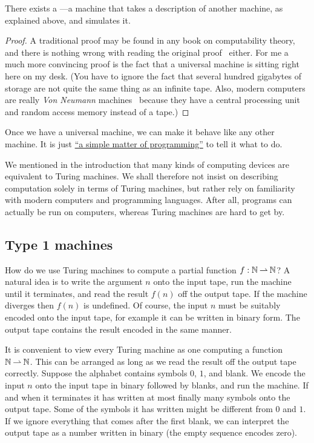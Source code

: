\begin{theorem}[Turing]
  \label{thm:universal-machine}
  There exists a ---a machine that takes a
  description of another machine, as explained above, and simulates
  it.
\end{theorem}

\begin{proof}
  A traditional proof may be found in any book on computability
  theory, and there is nothing wrong with reading the original
  proof~ either.
  For me a much more convincing proof is the fact that a universal
  machine is sitting right here on my desk. (You have to
    ignore the fact that several hundred gigabytes of storage are not
    quite the same thing as an infinite tape. Also, modern computers
    are really \emph{Von Neumann}
    machines~ because
    they have a central processing unit and random access memory
    instead of a tape.)
\end{proof}

Once we have a universal machine, we can make it behave like any other
machine. It is just
\href{http://www.catb.org/jargon/html/S/SMOP.html}{``a simple matter
  of programming''} to tell it what to do.

We mentioned in the introduction that many kinds of computing devices
are equivalent to Turing machines. We shall therefore not insist on
describing computation solely in terms of Turing machines, but rather
rely on familiarity with modern computers and programming languages.
After all, programs can actually be run on computers, whereas Turing
machines are hard to get by.


\subsection{Type 1 machines}
\label{sec:type-1}

How do we use Turing machines to compute a partial function $f :
\mathbb{N} \mathbin{\rightharpoonup} \mathbb{N}$? A natural idea is to write the argument $n$ onto the
input tape, run the machine until it terminates, and read the result
$f(n)$ off the output tape. If the machine diverges then $f(n)$ is
undefined. Of course, the input $n$ must be suitably encoded onto the
input tape, for example it can be written in binary form. The output
tape contains the result encoded in the same manner.

It is convenient to view every Turing machine as one computing a
function $\mathbb{N} \mathbin{\rightharpoonup} \mathbb{N}$. This can be arranged as long as we read the
result off the output tape correctly. Suppose the alphabet contains
symbols $0$, $1$, and blank. We encode the input $n$ onto the input
tape in binary followed by blanks, and run the machine. If and when it
terminates it has written at most finally many symbols onto the output
tape. Some of the symbols it has written might be different from $0$
and $1$. If we ignore everything that comes after the first blank, we
can interpret the output tape as a number written in binary (the empty
sequence encodes zero).

